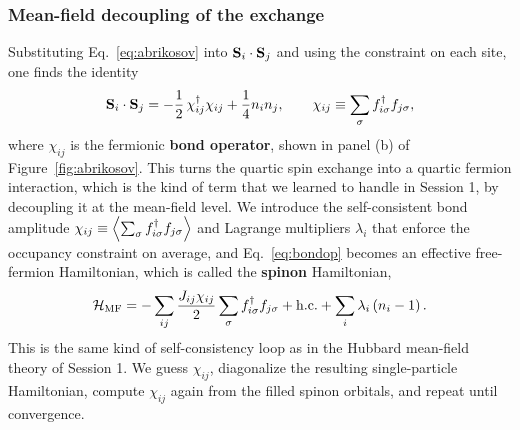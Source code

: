 \documentclass[lecture_notes.tex]{subfiles}
\begin{document}
\subsubsection{Mean-field decoupling of the exchange}
Substituting Eq.~\eqref{eq:abrikosov} into $\vb S_i\cdot\vb S_j$ and using the constraint on each
site, one finds the identity
\begin{equation}
  \vb S_i\cdot\vb S_j = -\frac12\, \chi_{ij}^\dagger\chi_{ij} + \frac14 n_i n_j, \qquad
  \chi_{ij} \equiv \sum_\sigma f^\dagger_{i\sigma}f_{j\sigma},
  \label{eq:bondop}
\end{equation}
where $\chi_{ij}$ is the fermionic \textbf{bond operator}, shown in panel (b) of
Figure~\ref{fig:abrikosov}. This turns the quartic spin exchange into a quartic fermion interaction,
which is the kind of term that we learned to handle in Session 1, by decoupling it at the mean-field
level. We introduce the self-consistent bond amplitude
$\chi_{ij}\equiv\expval{\sum_\sigma f^\dagger_{i\sigma}f_{j\sigma}}$ and Lagrange multipliers
$\lambda_i$ that enforce the occupancy constraint on average, and Eq.~\eqref{eq:bondop} becomes an
effective free-fermion Hamiltonian, which is called the \textbf{spinon} Hamiltonian,
\begin{equation}
  \mathcal{H}_{\mathrm{MF}} = -\sum_{ij}\frac{J_{ij}\chi_{ij}}{2}\sum_\sigma f^\dagger_{i\sigma}f_{j\sigma} + \mathrm{h.c.}
    + \sum_i \lambda_i\left(n_i - 1\right).
  \label{eq:mfspinon}
\end{equation}
This is the same kind of self-consistency loop as in the Hubbard mean-field theory of Session 1. We
guess $\chi_{ij}$, diagonalize the resulting single-particle Hamiltonian, compute $\chi_{ij}$ again
from the filled spinon orbitals, and repeat until convergence.
\end{document}
